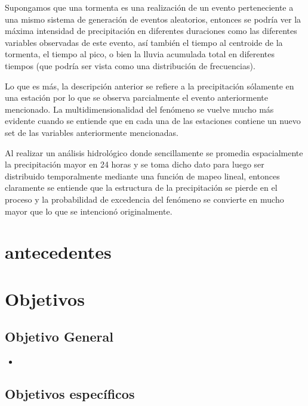 \documentclass[12pt]{report}
\begin{document}
Supongamos que una tormenta es una realización de un evento perteneciente a una mismo sistema de generación de eventos aleatorios, entonces se podría ver la máxima intensidad de precipitación en diferentes duraciones como las diferentes variables observadas de este evento, así también el tiempo al centroide de la tormenta, el tiempo al pico, o bien la lluvia acumulada total en diferentes tiempos (que podría ser vista como una distribución de frecuencias).

Lo que es más, la descripción anterior se refiere a la precipitación sólamente en una estación por lo que se observa parcialmente el evento anteriormente mencionado. La multidimensionalidad del fenómeno  se vuelve mucho más evidente cuando se entiende que en cada una de las estaciones contiene un nuevo set de las variables anteriormente mencionadas.

Al realizar un análisis hidrológico donde sencillamente se promedia espacialmente la precipitación mayor en 24 horas y se toma dicho dato para luego ser distribuido temporalmente mediante una función de mapeo lineal, entonces claramente se entiende que la estructura de la precipitación se pierde en el proceso y la probabilidad de excedencia del fenómeno se convierte en mucho mayor que lo que se intencionó originalmente.

\section{antecedentes}





\section {Objetivos}

\subsection{Objetivo General}

\begin{itemize}

\item 

\end{itemize}

\subsection{Objetivos específicos}
\end{document}
